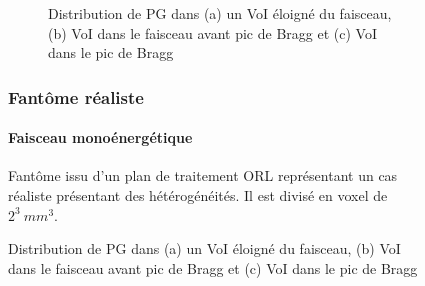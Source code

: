 \documentclass[11pt,a4paper,oldfontcommands]{memoir}
\begin{document}
\begin{figure}
\begin{figure}[h!]
\caption{ Distribution de PG dans (a) un VoI éloigné du faisceau, (b) VoI dans le faisceau avant pic de Bragg et (c) VoI dans le pic de Bragg }
\label{hetero pg}
\end{figure}


\subsubsection{Fantôme réaliste}

\paragraph{Faisceau monoénergétique}

Fantôme issu d'un plan de traitement ORL représentant un cas réaliste présentant des hétérogénéités. Il est divisé en voxel de $2^{3}~mm^{3}$. 
  

\end{figure}
\end{document}

